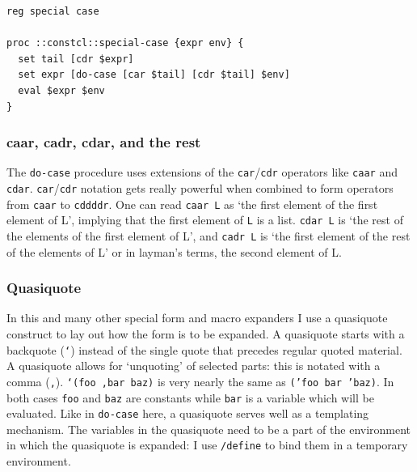 \documentclass[twoside]{report}
\begin{document}
\begin{lstlisting}
reg special case

proc ::constcl::special-case {expr env} {
  set tail [cdr $expr]
  set expr [do-case [car $tail] [cdr $tail] $env]
  eval $expr $env
}
\end{lstlisting}

\begin{pulledtext}

\subsubsection{caar, cadr, cdar, and the rest}
\label{caar-cadr-cdar-and-the-rest}

The \texttt{do-case} procedure uses extensions of the \texttt{car}/\texttt{cdr} operators like \texttt{caar} and \texttt{cdar}. \texttt{car}/\texttt{cdr} notation gets really powerful when combined to form operators from \texttt{caar} to \texttt{cddddr}. One can read \texttt{caar L} as `the first element of the first element of L', implying that the first element of \texttt{L} is a list. \texttt{cdar L} is `the rest of the elements of the first element of L', and \texttt{cadr L} is `the first element of the rest of the elements of L' or in layman's terms, the second element of L.
\end{pulledtext}

\begin{pulledtext}

\subsubsection{Quasiquote}
\label{quasiquote}

In this and many other special form and macro expanders I use a quasiquote construct to lay out how the form is to be expanded. A quasiquote starts with a backquote (\texttt{`}) instead of the single quote that precedes regular quoted material. A quasiquote allows for `unquoting' of selected parts: this is notated with a comma (\texttt{,}). \texttt{`(foo ,bar baz)} is very nearly the same as \texttt{('foo bar 'baz)}. In both cases \texttt{foo} and \texttt{baz} are constants while \texttt{bar} is a variable which will be evaluated. Like in \texttt{do-case} here, a quasiquote serves well as a templating mechanism. The variables in the quasiquote need to be a part of the environment in which the quasiquote is expanded: I use \texttt{/define} to bind them in a temporary environment.
\end{pulledtext}
\end{document}
